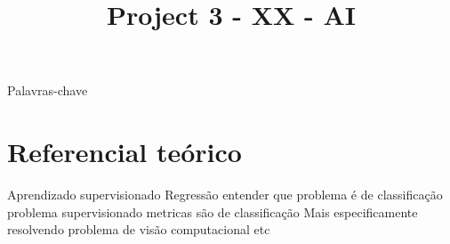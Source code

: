 \documentclass[twoside,conference,a4paper]{IEEEtran}
\begin{document}
\renewcommand{\IEEEkeywordsname}{Palavras-chave}


\title{Project 3 - XX - AI}
\author{%
}


\maketitle

\begin{abstract}

\end{abstract}

\begin{IEEEkeywords}
 Palavras-chave
\end{IEEEkeywords}



\section{Referencial teórico}
Aprendizado supervisionado
Regressão
entender que problema é de classificação
problema supervisionado
metricas são de classificação
Mais especificamente resolvendo problema de visão computacional
etc
\end{document}
